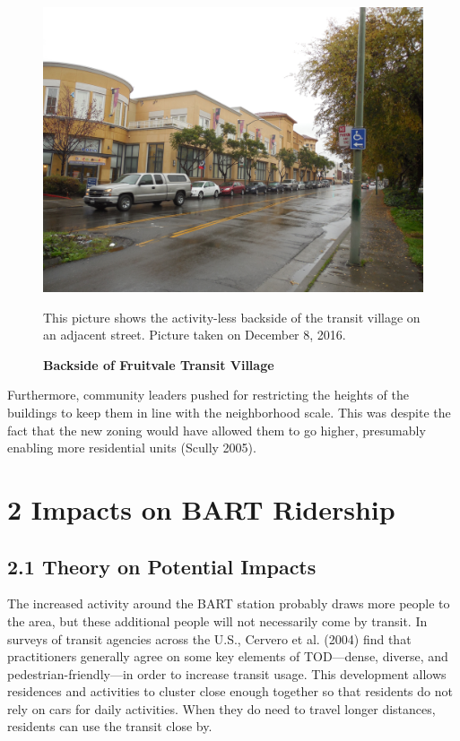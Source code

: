 \documentclass{article}
\begin{document}
\begin{figure}[H]
	\label{fig:Figure 4}
	\caption{\textbf{Backside of Fruitvale Transit Village}}
	\centering
	\begin{center}
	\includegraphics[width=0.9\linewidth]{fig4.jpg}
	\end{center}
	\begin{minipage}{0.9\linewidth}
	{\par \footnotesize This picture shows the activity-less backside of the transit village on an adjacent street. Picture taken on December 8, 2016.\par}
	\end{minipage}
\end{figure}

\noindent
Furthermore, community leaders pushed for restricting the heights of the buildings to keep them in line with the neighborhood scale. This was despite the fact that the new zoning would have allowed them to go higher, presumably enabling more residential units (Scully 2005). \\

\section*{2 Impacts on BART Ridership}

\subsection*{2.1 Theory on Potential Impacts}

The increased activity around the BART station probably draws more people to the area, but these additional people will not necessarily come by transit. In surveys of transit agencies across the U.S., Cervero et al. (2004) find that practitioners generally agree on some key elements of TOD---dense, diverse, and pedestrian-friendly---in order to increase transit usage. This development allows residences and activities to cluster close enough together so that residents do not rely on cars for daily activities. When they do need to travel longer distances, residents can use the transit close by. \\
\end{document}
